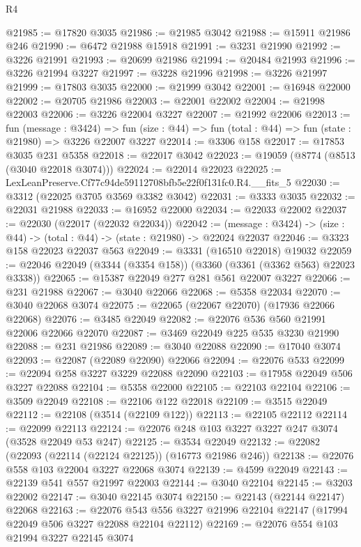 \begin{lexlean}{R4}
\begin{coremodule}
@21985 := @17820 @3035
@21986 := @21985 @3042
@21988 := @15911 @21986 @246
@21990 := @6472 @21988 @15918
@21991 := @3231 @21990
@21992 := @3226 @21991
@21993 := @20699 @21986
@21994 := @20484 @21993
@21996 := @3226 @21994 @3227
@21997 := @3228 @21996
@21998 := @3226 @21997
@21999 := @17803 @3035
@22000 := @21999 @3042
@22001 := @16948 @22000
@22002 := @20705 @21986
@22003 := @22001 @22002
@22004 := @21998 @22003
@22006 := @3226 @22004 @3227
@22007 := @21992 @22006
@22013 := fun (message : @3424) =>
  fun (size : @44) => fun (total : @44) => fun (state : @21980) => @3226 @22007 @3227
@22014 := @3306 @158
@22017 := @17853 @3035 @231 @5358
@22018 := @22017 @3042
@22023 := @19059 (@8774 (@8513 (@3040 @22018 @3074)))
@22024 := @22014 @22023
@22025 := LexLeanPreserve.Cf77c94de59112708bfb5e22f0f131fc0.R4.__fits_5
@22030 := @3312 (@22025 @3705 @3569 @3382 @3042)
@22031 := @3333 @3035
@22032 := @22031 @21988
@22033 := @16952 @22000
@22034 := @22033 @22002
@22037 := @22030 (@22017 (@22032 @22034))
@22042 := (message : @3424) -> (size : @44) -> (total : @44) -> (state : @21980) -> @22024 @22037
@22046 := @3323 @158 @22023 @22037 @563
@22049 := @3331 (@16510 @22018) @19032
@22059 := @22046 @22049 (@3344 (@3354 @158)) (@3360 (@3361 (@3362 @563) @22023 @3338))
@22065 := @15387 @22049 @277 @281 @561 @22007 @3227
@22066 := @231 @21988
@22067 := @3040 @22066
@22068 := @5358 @22034
@22070 := @3040 @22068 @3074
@22075 := @22065 (@22067 @22070) (@17936 @22066 @22068)
@22076 := @3485 @22049
@22082 := @22076 @536 @560 @21991 @22006 @22066 @22070
@22087 := @3469 @22049 @225 @535 @3230 @21990
@22088 := @231 @21986
@22089 := @3040 @22088
@22090 := @17040 @3074
@22093 := @22087 (@22089 @22090) @22066
@22094 := @22076 @533
@22099 := @22094 @258 @3227 @3229 @22088 @22090
@22103 := @17958 @22049 @506 @3227 @22088
@22104 := @5358 @22000
@22105 := @22103 @22104
@22106 := @3509 @22049
@22108 := @22106 @122 @22018
@22109 := @3515 @22049
@22112 := @22108 (@3514 (@22109 @122))
@22113 := @22105 @22112
@22114 := @22099 @22113
@22124 := @22076 @248 @103 @3227 @3227 @247 @3074 (@3528 @22049 @53 @247)
@22125 := @3534 @22049
@22132 := @22082 (@22093 (@22114 (@22124 @22125)) (@16773 @21986 @246))
@22138 := @22076 @558 @103 @22004 @3227 @22068 @3074
@22139 := @4599 @22049
@22143 := @22139 @541 @557 @21997 @22003
@22144 := @3040 @22104
@22145 := @3203 @22002
@22147 := @3040 @22145 @3074
@22150 := @22143 (@22144 @22147) @22068
@22163 := @22076
    @543
    @556
    @3227
    @21996
    @22104
    @22147
    (@17994 @22049 @506 @3227 @22088 @22104 @22112)
@22169 := @22076 @554 @103 @21994 @3227 @22145 @3074

\end{coremodule}
\end{lexlean}
